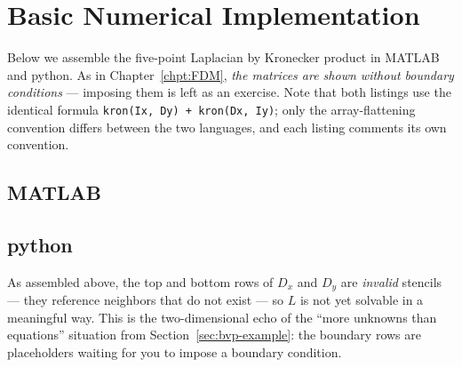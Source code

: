\section{Basic Numerical Implementation}
\label{sec:2Dcode}

Below we assemble the five-point Laplacian by Kronecker product in MATLAB and
python. As in Chapter~\ref{chpt:FDM}, \emph{the matrices are shown without
boundary conditions} --- imposing them is left as an exercise. Note that both
listings use the identical formula \verb|kron(Ix, Dy) + kron(Dx, Iy)|; only
the array-flattening convention differs between the two languages, and each
listing comments its own convention.

\subsection{MATLAB}


\subsection{python}




\begin{remark}
As assembled above, the top and bottom rows of $D_x$ and $D_y$ are
\emph{invalid} stencils --- they reference neighbors that do not exist --- so
$L$ is not yet solvable in a meaningful way. This is the two-dimensional echo
of the ``more unknowns than equations'' situation from
Section~\ref{sec:bvp-example}: the boundary rows are placeholders waiting for
you to impose a boundary condition.
\end{remark}





